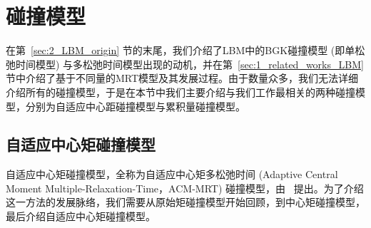 \section{碰撞模型}
\label{sec:bg_collision}
在第~\ref{sec:2_LBM_origin} 节的末尾，我们介绍了LBM中的BGK碰撞模型 (即单松弛时间模型) 与多松弛时间模型出现的动机，并在第~\ref{sec:1_related_works_LBM} 节中介绍了基于不同量的MRT模型及其发展过程。由于数量众多，我们无法详细介绍所有的碰撞模型，于是在本节中我们主要介绍与我们工作最相关的两种碰撞模型，分别为自适应中心距碰撞模型与累积量碰撞模型。

\subsection{自适应中心矩碰撞模型}
自适应中心矩碰撞模型，全称为自适应中心矩多松弛时间 (Adaptive Central Moment Multiple-Relaxation-Time，ACM-MRT) 碰撞模型，由~\citep{Li-2020} 提出。为了介绍这一方法的发展脉络，我们需要从原始矩碰撞模型开始回顾，到中心矩碰撞模型，最后介绍自适应中心矩碰撞模型。

